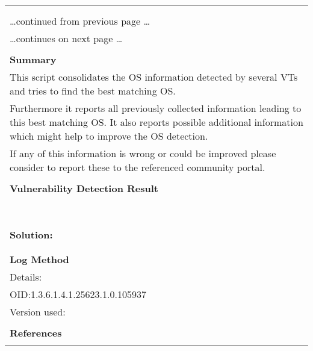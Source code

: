 \documentclass{article}
\begin{document}
\begin{longtable}{|p{}|}
\hline
\rowcolor{gvm_log}{\color{white}{Log (CVSS: 0.0) }}\\
\rowcolor{gvm_log}{\color{white}{NVT: OS Detection Consolidation and Reporting}}\\
\hline
\endfirsthead
\hfill\ldots continued from previous page \ldots \\
\hline
\endhead
\hline
\ldots continues on next page \ldots \\
\endfoot
\hline
\endlastfoot
\\
\textbf{Summary}\\
This script consolidates the OS information detected by several
  VTs and tries to find the best matching OS.\\
  Furthermore it reports all previously collected information leading to this best matching OS. It
  also reports possible additional information which might help to improve the OS detection.\\
  If any of this information is wrong or could be improved please consider to report these to the
  referenced community portal.\\

        \hline
        \\
\textbf{Vulnerability Detection Result}\\
\rowcolor{white}{\verb=Best matching OS:=}\\
\rowcolor{white}{\verb=OS:           Linux Kernel=}\\
\rowcolor{white}{\verb=CPE:          cpe:/o:linux:kernel=}\\
\rowcolor{white}{\verb=Found by NVT: 1.3.6.1.4.1.25623.1.0.102002 (Operating System (OS) Detection (ICM=}\\
\rowcolor{white}{$\hookrightarrow$\verb=P))=}\\
\rowcolor{white}{\verb=Concluded from ICMP based OS fingerprint=}\\
\rowcolor{white}{\verb=Setting key "Host/runs_unixoide" based on this information=}\\

          \hline
          \\
\textbf{Solution:}\\
\\


        \hline
        \\
\textbf{Log Method}\\
Details:
\rowcolor{white}{\verb=OS Detection Consolidation and Reporting=}\\
OID:1.3.6.1.4.1.25623.1.0.105937\\
Version used:
\rowcolor{white}{\verb=2022-04-05T09:27:51Z=}\\

      \hline
      \\
\textbf{References}\\
\rowcolor{white}{\verb=url: https://community.greenbone.net/c/vulnerability-tests=}\\
\end{longtable}
\end{document}
